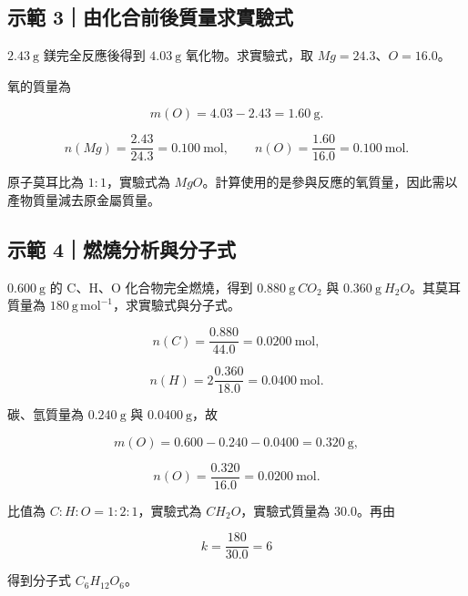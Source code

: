 \documentclass[11pt,a4paper]{article}
\begin{document}
\begin{HandoutWorkedExample}

\subsection{示範 3｜由化合前後質量求實驗式}\label{ux793aux7bc4-3ux7531ux5316ux5408ux524dux5f8cux8ceaux91cfux6c42ux5be6ux9a57ux5f0f}

\(2.43\ \mathrm g\) 鎂完全反應後得到 \(4.03\ \mathrm g\) 氧化物。求實驗式，取 \(Mg=24.3\)、\(O=16.0\)。

氧的質量為

\[
m(O)=4.03-2.43=1.60\ \mathrm g.
\]

\[
n(Mg)=\frac{2.43}{24.3}=0.100\ \mathrm{mol},\qquad
n(O)=\frac{1.60}{16.0}=0.100\ \mathrm{mol}.
\]

原子莫耳比為 \(1:1\)，實驗式為 \(MgO\)。計算使用的是參與反應的氧質量，因此需以產物質量減去原金屬質量。

\end{HandoutWorkedExample}

\begin{HandoutWorkedExample}

\subsection{示範 4｜燃燒分析與分子式}\label{ux793aux7bc4-4ux71c3ux71d2ux5206ux6790ux8207ux5206ux5b50ux5f0f}

\(0.600\ \mathrm g\) 的 C、H、O 化合物完全燃燒，得到 \(0.880\ \mathrm g\ CO_2\) 與 \(0.360\ \mathrm g\ H_2O\)。其莫耳質量為 \(180\ \mathrm{g\,mol^{-1}}\)，求實驗式與分子式。

\[
n(C)=\frac{0.880}{44.0}=0.0200\ \mathrm{mol},
\]

\[
n(H)=2\frac{0.360}{18.0}=0.0400\ \mathrm{mol}.
\]

碳、氫質量為 \(0.240\ \mathrm g\) 與 \(0.0400\ \mathrm g\)，故

\[
m(O)=0.600-0.240-0.0400=0.320\ \mathrm g,
\]

\[
n(O)=\frac{0.320}{16.0}=0.0200\ \mathrm{mol}.
\]

比值為 \(C:H:O=1:2:1\)，實驗式為 \(CH_2O\)，實驗式質量為 \(30.0\)。再由

\[
k=\frac{180}{30.0}=6
\]

得到分子式 \(C_6H_{12}O_6\)。

\end{HandoutWorkedExample}
\end{document}
